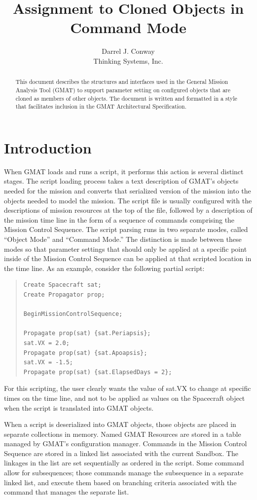 \documentclass[10pt,letterpaper]{article}
\author{Darrel J. Conway\\Thinking Systems, Inc.}
\title{Assignment to Cloned Objects in Command Mode}
\begin{document}
\maketitle
\begin{abstract}
This document describes the structures and interfaces used in the General Mission Analysis Tool (GMAT) to support parameter setting on configured objects that are cloned as members of other objects.  The document is written and formatted in a style that facilitates inclusion in the GMAT Architectural Specification.
\end{abstract}

\section{Introduction}

When GMAT loads and runs a script, it performs this action is several distinct stages.  The script loading process takes a text description of GMAT's objects needed for the mission and converts that serialized version of the mission into the objects needed to model the mission.  The script file is usually configured with the descriptions of mission resources at the top of the file, followed by a description of the mission time line in the form of a sequence of commands comprising the Mission Control Sequence.  The script parsing runs in two separate modes, called ``Object Mode'' and ``Command Mode.''  The distinction is made between these modes so that parameter settings that should only be applied at a specific point inside of the Mission Control Sequence can be applied at that scripted location in the time line.  As an example, consider the following partial script:
\begin{quote}
\begin{verbatim}
Create Spacecraft sat;
Create Propagator prop;

BeginMissionControlSequence;

Propagate prop(sat) {sat.Periapsis};
sat.VX = 2.0;
Propagate prop(sat) {sat.Apoapsis};
sat.VX = -1.5;
Propagate prop(sat) {sat.ElapsedDays = 2};
\end{verbatim}
\end{quote} 

\noindent For this scripting, the user clearly wants the value of sat.VX to change at specific times on the time line, and not to be applied as values on the Spacecraft object when the script is translated into GMAT objects.

When a script is deserialized into GMAT objects, those objects are placed in separate collections in memory.  Named GMAT Resources are stored in a table managed by GMAT's configuration manager.  Commands in the Mission Control Sequence are stored in a linked list associated with the current Sandbox.  The linkages in the list are set sequentially as ordered in the script.  Some command allow for subsequences; those commands manage the subsequence in a separate linked list, and execute them based on branching criteria associated with the command that manages the separate list.
\end{document}
